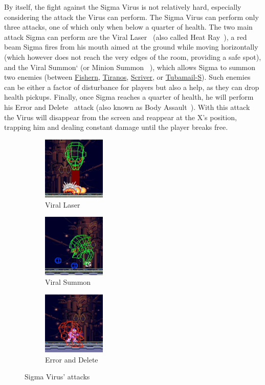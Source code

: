 By itself, the fight against the Sigma Virus is not relatively hard, especially considering the attack the Virus can perform. The Sigma Virus can perform only three attacks, one of which only when below a quarter of health. The two main attack Sigma can perform are the Viral Laser~\cite{book:MH_field_guide} (also called Heat Ray~\cite{book:Compendium}), a red beam Sigma fires from his mouth aimed at the ground while moving horizontally (which however does not reach the very edges of the room, providing a safe spot), and the Viral Summon`\cite{book:MH_field_guide} (or Minion Summon ~\cite{book:Compendium}), which allows Sigma to summon two enemies (between \hyperlink{enem:Fishern}{Fishern}, \hyperlink{enem:Tiranos}{Tiranos}, \hyperlink{enem:Scriver}{Scriver}, or \hyperlink{enem:Tubamail-S}{Tubamail-S}). Such enemies can be either a factor of disturbance for players but also a help, as they can drop health pickups. Finally, once Sigma reaches a quarter of health, he will perform his Error and Delete~\cite{book:MH_field_guide} attack (also known as Body Assault~\cite{book:Compendium}). With this attack the Virus will disappear from the screen and reappear at the X's position, trapping him and dealing constant damage until the player breaks free.
\begin{figure}[htp]
	\centering
	\begin{subfigure}{0.3\linewidth}
		\centering
		\includegraphics[height=3cm]{figures/X2/Hunter_stages/Sigma_virus_laser.png}
		\caption{Viral Laser}	
	\end{subfigure}
	\begin{subfigure}{0.3\linewidth}
		\centering
		\includegraphics[height=3cm]{figures/X2/Hunter_stages/Sigma_virus_spawn.png}
		\caption{Viral Summon}
	\end{subfigure}
	\begin{subfigure}{0.3\linewidth}
		\centering
		\includegraphics[height=3cm]{figures/X2/Hunter_stages/Sigma_virus_trap.png}
		\caption{Error and Delete}
	\end{subfigure}
	\caption{Sigma Virus' attacks}
\end{figure}

